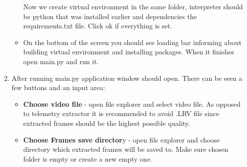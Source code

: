 \documentclass[a4paper,12pt]{article}
\begin{document}
\begin{enumerate}
\begin{itemize}
\begin{minipage}[t]{\linewidth}
{				}		
				\medskip	
			\end{minipage}
			Now we create virtual environment in the same folder, interpreter should be python that was installed earlier and dependencies the requirements.txt file. Click ok if everything is set.
			\linebreak
			\item \begin{minipage}[t]{\linewidth}
				\raggedright
				\medskip	
			\end{minipage}
			On the bottom of the screen you should see loading bar informing about building virtual environment and installing packages. When it finishes open main.py and run it.
		\end{itemize}		
	 \item \begin{minipage}[t]{\linewidth}
		\raggedright
		\medskip	
	\end{minipage}
	After running main.py application window should open.
	There can be seen a few buttons and an input area:
	\begin{itemize}
		\item \textbf{Choose video file} - open file explorer and select video file. As opposed to telemetry extractor it is recommended to avoid .LRV file since extracted frames should be the highest possible quality.
		\item \textbf{Choose Frames save director}y - open file explorer and choose directory which extracted frames will be saved to. Make sure chosen folder is empty or create a new empty one.

\end{itemize}
\end{enumerate}
\end{document}
